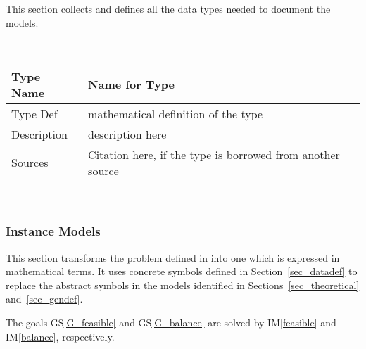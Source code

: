 \documentclass[12pt]{article}
\newcommand{\colAwidth}{0.13\textwidth}
\newcommand{\colBwidth}{0.82\textwidth}
\newcommand{\gsref}[1]{GS\ref{#1}}
\newcommand{\iref}[1]{IM\ref{#1}}
\begin{document}



This section collects and defines all the data types needed to document the
models. 

~\newline

\noindent
\begin{minipage}{\textwidth}
\renewcommand*{\arraystretch}{1.5}
\begin{tabular}{| p{\colAwidth} | p{\colBwidth}|}
  \hline
  \rowcolor[gray]{0.9}
  Type Name & Name for Type\\
  \hline
  Type Def & mathematical definition of the type\\
  \hline
  Description & description here
  \\
  \hline
  Sources & Citation here, if the type is borrowed from another source\\
  \hline
\end{tabular}
\end{minipage}\\

\subsubsection{Instance Models} \label{sec_instance}    

This section transforms the problem defined in  into 
one which is expressed in mathematical terms. It uses concrete symbols defined 
in Section~\ref{sec_datadef} to replace the abstract symbols in the models 
identified in Sections~\ref{sec_theoretical} and~\ref{sec_gendef}.

The goals \gsref{G_feasible} and \gsref{G_balance} are solved by \iref{feasible}
and \iref{balance}, respectively. 

~\newline
\end{document}

